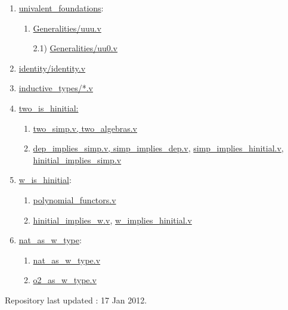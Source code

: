 \documentclass{article}
\theoremstyle{remark}
\theoremstyle{definition}
\begin{document}
\begin{enumerate}[1)]
\item \url{univalent_foundations}:
         \begin{enumerate}[{1}.1)]
         \item \url{Generalities/uuu.v}
\item[2.1)] \url{Generalities/uu0.v}
\end{enumerate}
\item \url{identity/identity.v}
\item \url{inductive_types/*.v}
\item \url{two_is_hinitial:}
\begin{enumerate}[{4}.1)]
      \item \url{two_simp.v, two_algebras.v}
\item \url{dep_implies_simp.v, simp_implies_dep.v},
\url{simp_implies_hinitial.v}, \url{hinitial_implies_simp.v}
\end{enumerate}
\item \url{w_is_hinitial}:
\begin{enumerate}[{5}.1)]
      \item \url{polynomial_functors.v}
       \item  \url{hinitial_implies_w.v}, \url{w_implies_hinitial.v}
 \end{enumerate}
\item \url{nat_as_w_type}:
\begin{enumerate}[{6}.1)]
      \item  \url{nat_as_w_type.v}
\item \url{o2_as_w_type.v}
\end{enumerate}
\end{enumerate}

\medskip

\noindent
Repository last updated : 17 Jan 2012.

\bigskip
\end{document}
